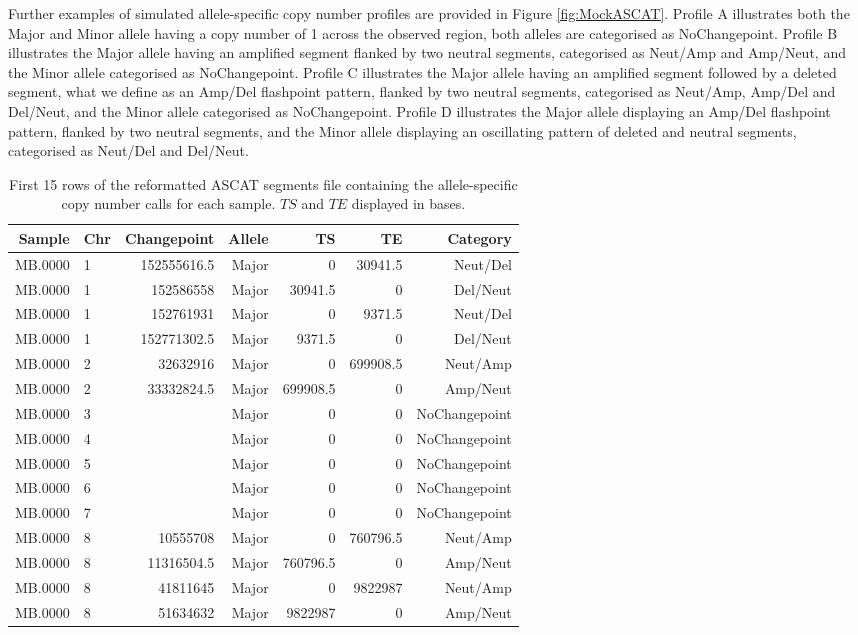 Further examples of simulated allele-specific copy number profiles are provided in Figure \ref{fig:MockASCAT}. Profile A illustrates both the Major and Minor allele having a copy number of 1 across the observed region, both alleles are categorised as NoChangepoint. Profile B illustrates the Major allele having an amplified segment flanked by two neutral segments, categorised as Neut/Amp and Amp/Neut, and the Minor allele categorised as NoChangepoint. Profile C illustrates the Major allele having an amplified segment followed by a deleted segment, what we define as an Amp/Del flashpoint pattern, flanked by two neutral segments, categorised as Neut/Amp, Amp/Del and Del/Neut, and the Minor allele categorised as NoChangepoint. Profile D illustrates the Major allele displaying an Amp/Del flashpoint pattern, flanked by two neutral segments, and the Minor allele displaying an oscillating pattern of deleted and neutral segments, categorised as Neut/Del and Del/Neut. 

\begin{table}[H]
\vspace{-0.3cm}
\centering
\caption{First 15 rows of the reformatted ASCAT segments file containing the allele-specific copy number calls for each sample. $TS$ and $TE$ displayed in bases.}
\begin{tabular}{rlrrrrr}
  \hline
 Sample & Chr & Changepoint & Allele & TS & TE & Category \\ 
  \hline
MB.0000 & 1 & 152555616.5 & Major & 0 & 30941.5 & Neut/Del \\ 
MB.0000 & 1 & 152586558 & Major & 30941.5 & 0 & Del/Neut  \\ 
MB.0000 & 1 & 152761931 & Major & 0 & 9371.5 & Neut/Del \\ 
MB.0000 & 1 & 152771302.5 & Major & 9371.5 & 0 & Del/Neut \\ 
MB.0000 & 2 & 32632916 & Major & 0 & 699908.5 & Neut/Amp \\ 
MB.0000 & 2 & 33332824.5 & Major & 699908.5 & 0 & Amp/Neut  \\ 
MB.0000 & 3 &  & Major & 0 & 0 & NoChangepoint \\ 
MB.0000 & 4 &  & Major & 0 & 0 & NoChangepoint  \\ 
MB.0000 & 5 &  & Major & 0 & 0 & NoChangepoint  \\ 
 MB.0000 & 6 &  & Major & 0 & 0 & NoChangepoint  \\ 
 MB.0000 & 7 &  & Major & 0 & 0 & NoChangepoint  \\ 
 MB.0000 & 8 & 10555708 & Major & 0 & 760796.5 & Neut/Amp  \\ 
 MB.0000 & 8 & 11316504.5 & Major & 760796.5 & 0 & Amp/Neut  \\ 
 MB.0000 & 8 & 41811645 & Major & 0 & 9822987 & Neut/Amp \\ 
 MB.0000 & 8 & 51634632 & Major & 9822987 & 0 & Amp/Neut \\ 
   \hline
\end{tabular}
\label{ReformattedData}
\end{table}
 
